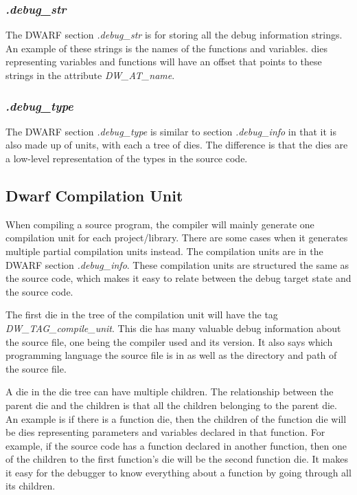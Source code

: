 \subsubsection{\emph{.debug\_str}}
The DWARF section \emph{.debug\_str} is for storing all the debug information strings.
An example of these strings is the names of the functions and variables.
\glspl{die} representing variables and functions will have an offset that points to these strings in the attribute \emph{DW\_AT\_name}. 


\subsubsection{\emph{.debug\_type}}
The \gls{DWARF} section \emph{.debug\_type} is similar to section \emph{.debug\_info} in that it is also made up of units, with each a tree of \glspl{die}.
The difference is that the \glspl{die} are a low-level representation of the types in the source code.



\subsection{Dwarf Compilation Unit}
When compiling a source program, the compiler will mainly generate one compilation unit for each project/library.
There are some cases when it generates multiple partial compilation units instead.
The compilation units are in the \gls{DWARF} section \emph{.debug\_info}.
These compilation units are structured the same as the source code, which makes it easy to relate between the debug target state and the source code.


The first \gls{die} in the tree of the compilation unit will have the tag \emph{DW\_TAG\_compile\_unit}.
This \gls{die} has many valuable debug information about the source file, one being the compiler used and its version.
It also says which programming language the source file is in as well as the directory and path of the source file.


A \gls{die} in the \gls{die} tree can have multiple children.
The relationship between the parent \gls{die} and the children is that all the children belonging to the parent \gls{die}.
An example is if there is a function \gls{die}, then the children of the function \gls{die} will be \glspl{die} representing parameters and variables declared in that function.
For example, if the source code has a function declared in another function, then one of the children to the first function's \gls{die} will be the second function \gls{die}.
It makes it easy for the debugger to know everything about a function by going through all its children.


